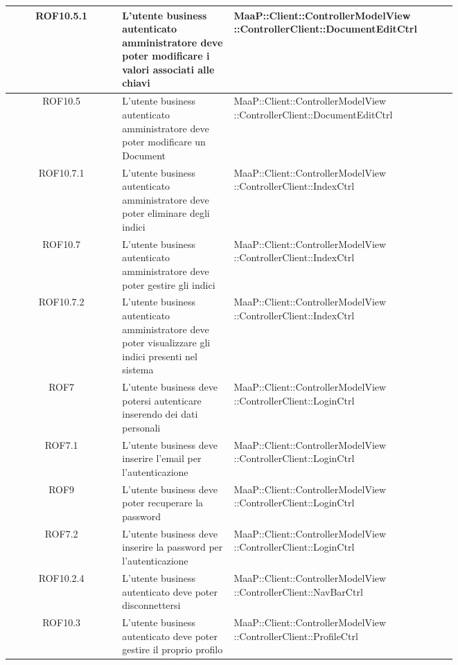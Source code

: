 \begin{center}
\begin{longtable}{|c|p{0.25\linewidth}|p{0.5\linewidth}|}
\midrule
ROF10.5.1
& L'utente business autenticato amministratore deve poter modificare i valori associati alle chiavi
& MaaP::Client::ControllerModelView ::ControllerClient::DocumentEditCtrl\\

\midrule
ROF10.5
& L'utente business autenticato amministratore deve poter modificare un Document
& MaaP::Client::ControllerModelView ::ControllerClient::DocumentEditCtrl\\

\midrule
ROF10.7.1
& L'utente business autenticato amministratore deve poter eliminare degli indici
& MaaP::Client::ControllerModelView ::ControllerClient::IndexCtrl\\

\midrule
ROF10.7
& L'utente business autenticato amministratore deve poter gestire gli indici
& MaaP::Client::ControllerModelView ::ControllerClient::IndexCtrl\\

\midrule
ROF10.7.2
& L'utente business autenticato amministratore deve poter visualizzare gli indici presenti nel sistema
& MaaP::Client::ControllerModelView ::ControllerClient::IndexCtrl\\

\midrule
ROF7
& L'utente business deve potersi autenticare inserendo dei dati personali
& MaaP::Client::ControllerModelView ::ControllerClient::LoginCtrl\\

\midrule
ROF7.1
& L'utente business deve inserire l'email per l'autenticazione
& MaaP::Client::ControllerModelView ::ControllerClient::LoginCtrl\\

\midrule
ROF9
& L'utente business deve poter recuperare la password
& MaaP::Client::ControllerModelView ::ControllerClient::LoginCtrl\\

\midrule
ROF7.2
& L'utente business deve inserire la password per l'autenticazione
& MaaP::Client::ControllerModelView ::ControllerClient::LoginCtrl\\

\midrule
ROF10.2.4
& L'utente business autenticato deve poter disconnettersi
& MaaP::Client::ControllerModelView ::ControllerClient::NavBarCtrl\\

\midrule
ROF10.3
& L'utente business autenticato deve poter gestire il proprio profilo
& MaaP::Client::ControllerModelView ::ControllerClient::ProfileCtrl\\


\end{longtable}
\end{center}
